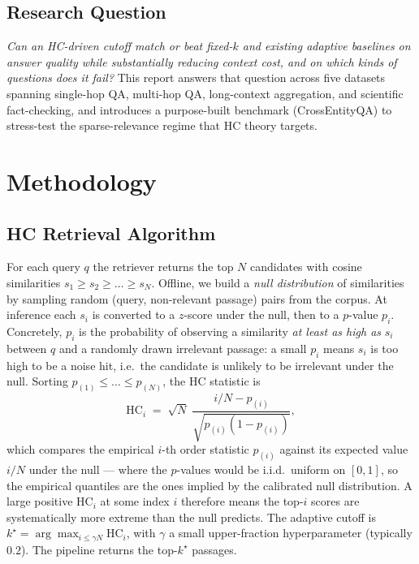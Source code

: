 \documentclass[letterpaper]{article}
\begin{document}
\subsection{Research Question}
\emph{Can an HC-driven cutoff match or beat fixed-$k$ and existing
adaptive baselines on answer quality while substantially reducing
context cost, and on which kinds of questions does it fail?}
This report answers that question across five datasets spanning
single-hop QA, multi-hop QA, long-context aggregation, and scientific
fact-checking, and introduces a purpose-built benchmark
(CrossEntityQA) to stress-test the sparse-relevance regime that HC
theory targets.

\section{Methodology}

\subsection{HC Retrieval Algorithm}
For each query $q$ the retriever returns the top $N$ candidates with
cosine similarities $s_1 \ge s_2 \ge \dots \ge s_N$. Offline, we build
a \emph{null distribution} of similarities by sampling random
(query, non-relevant passage) pairs from the corpus. At inference each
$s_i$ is converted to a $z$-score under the null, then to a $p$-value
$p_i$. Concretely, $p_i$ is the probability of observing a similarity
\emph{at least as high as} $s_i$ between $q$ and a randomly drawn
irrelevant passage: a small $p_i$ means $s_i$ is too high to be a
noise hit, i.e.\ the candidate is unlikely to be irrelevant under
the null. Sorting $p_{(1)} \le \dots \le p_{(N)}$, the HC statistic
is
\[
\mathrm{HC}_i \;=\; \sqrt{N}\;\frac{i/N - p_{(i)}}{\sqrt{p_{(i)}(1-p_{(i)})}},
\]
which compares the empirical $i$-th order statistic $p_{(i)}$ against
its expected value $i/N$ under the null --- where the $p$-values
would be i.i.d.\ uniform on $[0,1]$, so the empirical quantiles are
the ones implied by the calibrated null distribution. A large
positive $\mathrm{HC}_i$ at some index $i$ therefore means the
top-$i$ scores are systematically more extreme than the null
predicts. The adaptive cutoff is
$k^\star = \arg\max_{i \le \gamma N} \mathrm{HC}_i$, with $\gamma$ a
small upper-fraction hyperparameter (typically $0.2$). The pipeline
returns the top-$k^\star$ passages.
\end{document}
